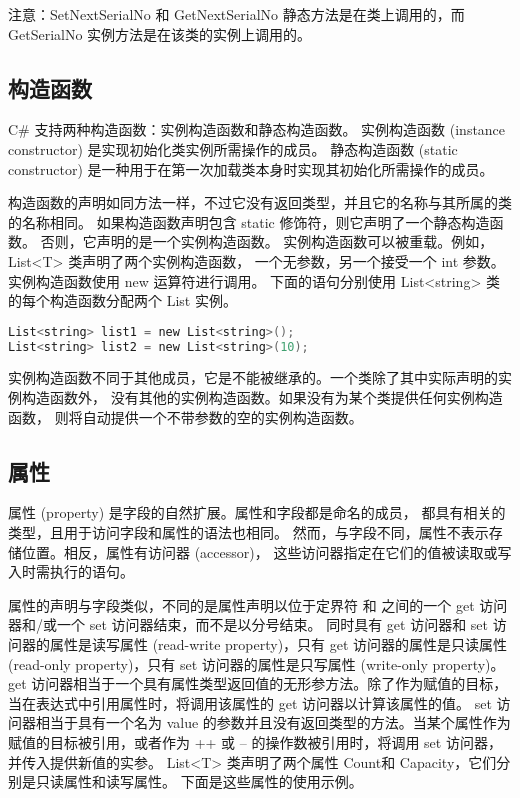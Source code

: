 注意：SetNextSerialNo 和 GetNextSerialNo 静态方法是在类上调用的，而 GetSerialNo 实例方法是在该类的实例上调用的。


\subsection{构造函数}
C\# 支持两种构造函数：实例构造函数和静态构造函数。
实例构造函数 (instance constructor) 是实现初始化类实例所需操作的成员。
静态构造函数 (static constructor) 是一种用于在第一次加载类本身时实现其初始化所需操作的成员。

构造函数的声明如同方法一样，不过它没有返回类型，并且它的名称与其所属的类的名称相同。
如果构造函数声明包含 static 修饰符，则它声明了一个静态构造函数。
否则，它声明的是一个实例构造函数。
实例构造函数可以被重载。例如，List<T> 类声明了两个实例构造函数，
一个无参数，另一个接受一个 int 参数。实例构造函数使用 new 运算符进行调用。
下面的语句分别使用 List<string> 类的每个构造函数分配两个 List 实例。

 \begin{lstlisting}[language=C]
List<string> list1 = new List<string>();
List<string> list2 = new List<string>(10);
 \end{lstlisting}

实例构造函数不同于其他成员，它是不能被继承的。一个类除了其中实际声明的实例构造函数外，
没有其他的实例构造函数。如果没有为某个类提供任何实例构造函数，
则将自动提供一个不带参数的空的实例构造函数。

\subsection{属性}

属性 (property) 是字段的自然扩展。属性和字段都是命名的成员，
都具有相关的类型，且用于访问字段和属性的语法也相同。
然而，与字段不同，属性不表示存储位置。相反，属性有访问器 (accessor)，
这些访问器指定在它们的值被读取或写入时需执行的语句。

属性的声明与字段类似，不同的是属性声明以位于定界符 { 和 } 之间的一个 get 访问器和/或一个 set 访问器结束，而不是以分号结束。
同时具有 get 访问器和 set 访问器的属性是读写属性 (read-write property)，只有 get 访问器的属性是只读属性 (read-only property)，只有 set 访问器的属性是只写属性 (write-only property)。
get 访问器相当于一个具有属性类型返回值的无形参方法。除了作为赋值的目标，当在表达式中引用属性时，将调用该属性的 get 访问器以计算该属性的值。
set 访问器相当于具有一个名为 value 的参数并且没有返回类型的方法。当某个属性作为赋值的目标被引用，或者作为 ++ 或 -- 的操作数被引用时，将调用 set 访问器，并传入提供新值的实参。
List<T> 类声明了两个属性 Count和 Capacity，它们分别是只读属性和读写属性。
下面是这些属性的使用示例。

